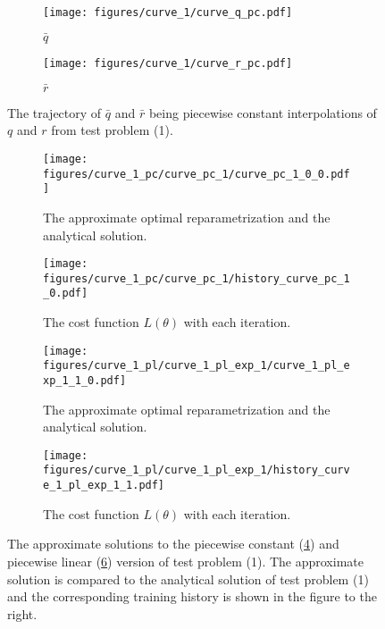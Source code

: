 
\begin{figure}[t]\label{fig:curve_1_pc}
    \begin{subfigure}[t]{0.5\textwidth}\label{fig:curve_1_pc_q}
        \centering
        \texttt{[image: figures/curve\_1/curve\_q\_pc.pdf]}
        \caption{\(\bar q\)}
    \end{subfigure}
    \begin{subfigure}[t]{0.5\textwidth}\label{fig:curve_1_pc_r}
        \centering
        \texttt{[image: figures/curve\_1/curve\_r\_pc.pdf]}
        \caption{\(\bar r\)}
    \end{subfigure}
    \caption{The trajectory of \(\bar q\) and \(\bar r\) being piecewise constant interpolations of $q$ and $r$ from test problem (1).}
\end{figure}

\begin{figure}[t]\label{fig:curve_1_pc_pl_example}
    \begin{subfigure}[t]{0.5\textwidth}
        \centering
        \texttt{[image: figures/curve\_1\_pc/curve\_pc\_1/curve\_pc\_1\_0\_0.pdf]}
        \caption{The approximate optimal reparametrization and the analytical solution.}
        \label{fig:curve_1_pc_solution}
    \end{subfigure}
    \begin{subfigure}[t]{0.5\textwidth}
        \centering
        \texttt{[image: figures/curve\_1\_pc/curve\_pc\_1/history\_curve\_pc\_1\_0.pdf]}
        \caption{The cost function \(L(\theta)\) with each iteration.}
        \label{fig:curve_1_pc_history}
    \end{subfigure}
    \begin{subfigure}[t]{0.5\textwidth}
        \centering
        \texttt{[image: figures/curve\_1\_pl/curve\_1\_pl\_exp\_1/curve\_1\_pl\_exp\_1\_1\_0.pdf]}
        \caption{The approximate optimal reparametrization and the analytical solution.}
        \label{fig:curve_1_pl_solution}
    \end{subfigure}
    \begin{subfigure}[t]{0.5\textwidth}
        \centering
        \texttt{[image: figures/curve\_1\_pl/curve\_1\_pl\_exp\_1/history\_curve\_1\_pl\_exp\_1\_1.pdf]}
        \caption{The cost function \(L(\theta)\) with each iteration.}
        \label{fig:curve_1_pl_history}
    \end{subfigure}
    \caption{The approximate solutions to the piecewise constant (\ref{fig:curve_1_pc_solution}) and piecewise linear (\ref{fig:curve_1_pl_solution}) version of test problem (1). The approximate solution is compared to the analytical solution of test problem (1) and the corresponding training history is shown in the figure to the right.}
\end{figure}

